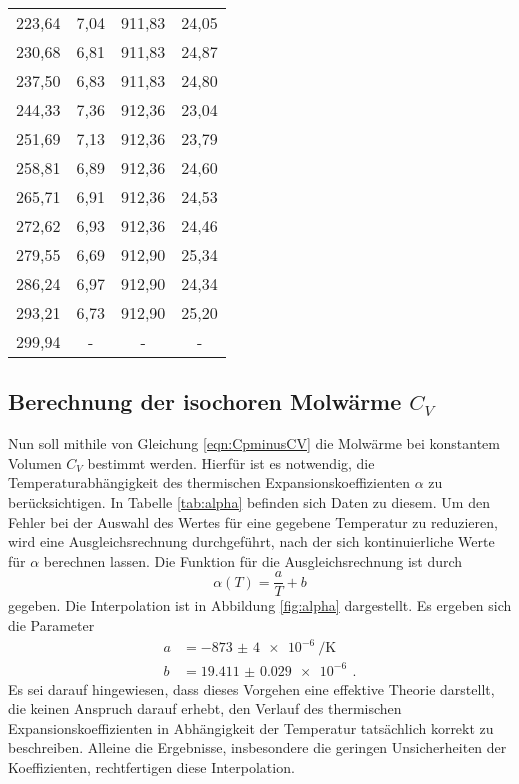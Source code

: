 \begin{table}[htp]
\begin{center}
\begin{tabular}{cccc}
			223,64 & 7,04 & 911,83 & 24,05\\
			230,68 & 6,81 & 911,83 & 24,87\\
			237,50 & 6,83 & 911,83 & 24,80\\
			244,33 & 7,36 & 912,36 & 23,04\\
			251,69 & 7,13 & 912,36 & 23,79\\
			258,81 & 6,89 & 912,36 & 24,60\\
			265,71 & 6,91 & 912,36 & 24,53\\
			272,62 & 6,93 & 912,36 & 24,46\\
			279,55 & 6,69 & 912,90 & 25,34\\
			286,24 & 6,97 & 912,90 & 24,34\\
			293,21 & 6,73 & 912,90 & 25,20\\
			299,94 & - & - & -\\
		\bottomrule
		\end{tabular}
	\end{center}
\end{table}


\subsection{Berechnung der isochoren Molwärme $C_V$}
\label{subsec:cv}

Nun soll mithile von Gleichung \eqref{eqn:CpminusCV} die Molwärme bei konstantem Volumen $C_V$ bestimmt werden.
Hierfür ist es notwendig, die Temperaturabhängigkeit des thermischen Expansionskoeffizienten
$\alpha$ zu berücksichtigen. In Tabelle \ref{tab:alpha} befinden sich Daten zu diesem.
Um den Fehler bei der Auswahl des Wertes für eine gegebene Temperatur zu reduzieren, wird eine Ausgleichsrechnung durchgeführt, nach der sich kontinuierliche Werte für $\alpha$ berechnen lassen. Die Funktion für die Ausgleichsrechnung ist durch
\begin{equation*}
  \alpha(T)=\frac{a}{T}+b
\end{equation*}
gegeben. Die Interpolation ist in Abbildung \ref{fig:alpha} dargestellt. Es ergeben sich die Parameter
\begin{align*}
  a&=\SI{-873(4)e-6}{\per\kelvin} \,\\
  b&=\SI{19.411(29)e-6}{} \,.
\end{align*}
Es sei darauf hingewiesen, dass dieses Vorgehen eine effektive Theorie darstellt, die keinen Anspruch darauf erhebt, den Verlauf des thermischen Expansionskoeffizienten in Abhängigkeit der Temperatur tatsächlich korrekt zu beschreiben. Alleine die Ergebnisse, insbesondere die geringen Unsicherheiten der Koeffizienten, rechtfertigen diese Interpolation.

